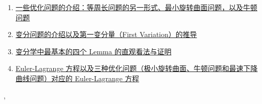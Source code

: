 \documentclass[11pt]{article}
\renewcommand{\today}{\shortmonthname[\the\month] \the \day,  \the\year}
\begin{document}
\begin{enumerate}
	\item \href{https://mp.weixin.qq.com/s/3QkG6f-wmX_GUvY1A0463A}{一些优化问题的介绍：等周长问题的另一形式、最小旋转曲面问题，以及牛顿问题}	%
	\item \href{https://mp.weixin.qq.com/s/BlK3ufBBY0PhU4a5icBFqQ}{变分问题的介绍以及第一变分量（First Variation）的推导}	%
	\item \href{https://mp.weixin.qq.com/s/wMiMcppEsfWWEO-l55bqiA}{变分学中最基本的四个 Lemma 的直观看法与证明}	%
	\item \href{https://mp.weixin.qq.com/s/Vt0tiuqlMAN7HiSfNL0OuA}{Euler-Lagrange 方程以及三种优化问题（极小旋转曲面、牛顿问题和最速下降曲线问题）对应的 Euler-Lagrange 方程}	%
\end{enumerate}




%
\begin{flushright}
	\tiny \today 
\end{flushright}
\end{document}
